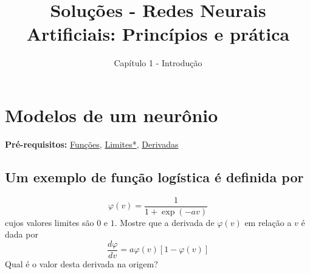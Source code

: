 \documentclass[12pt, openright, a4paper, twoside, english, brazil]{article}
\title{Soluções - Redes Neurais Artificiais: Princípios e prática}
\author{Capítulo 1 - Introdução}
\date{}
\newcommand{\df}[2]{\frac{d#1}{d#2}}
\newcommand{\ghlink}[2]{\href{https://github.com/dreisss/study-notes/blob/main/#1}{#2}}
\newcommand{\difflink}[1]{\ghlink{Differentiation/Real/Abstract_pt.pdf}{#1}}
\begin{document}
\maketitle

\section{Modelos de um neurônio}

{\bf Pré-requisitos:}
\ghlink{Functions/Abstract_pt.pdf}{Funções},
\ghlink{Functions/Abstract_pt.pdf}{Limites*},
\difflink{Derivadas}

\subsection{Um exemplo de função logística é definida por}
$$
\varphi(v)=\frac{1}{1+\exp(-av)}
$$
cujos valores limites são $0$ e $1$. Mostre que a derivada de
$\varphi(v)$ em relação a $v$ é dada por
$$
\df{\varphi}{v}=a\varphi(v)[1-\varphi(v)]
$$
Qual é o valor desta derivada na origem?\\
\end{document}
